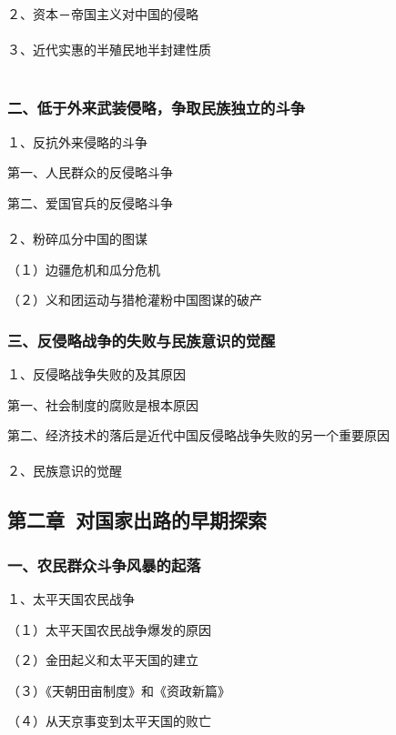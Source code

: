 \documentclass{ctexart}
\begin{document}
２、资本－帝国主义对中国的侵略
\\\\


３、近代实惠的半殖民地半封建性质
\\\\


\subsubsection{二、低于外来武装侵略，争取民族独立的斗争}
１、反抗外来侵略的斗争

第一、人民群众的反侵略斗争

第二、爱国官兵的反侵略斗争
\\\\

２、粉碎瓜分中国的图谋

（１）边疆危机和瓜分危机

（２）义和团运动与猎枪灌粉中国图谋的破产

\subsubsection{三、反侵略战争的失败与民族意识的觉醒}

１、反侵略战争失败的及其原因

第一、社会制度的腐败是根本原因

第二、经济技术的落后是近代中国反侵略战争失败的另一个重要原因
\\\\

２、民族意识的觉醒



\subsection{第二章\ 对国家出路的早期探索}

\subsubsection{一、农民群众斗争风暴的起落}

１、太平天国农民战争

（１）太平天国农民战争爆发的原因

（２）金田起义和太平天国的建立

（３）《天朝田亩制度》和《资政新篇》

（４）从天京事变到太平天国的败亡
\\\\
\end{document}
